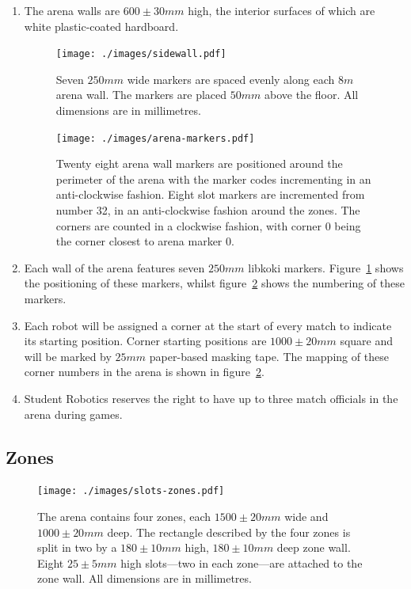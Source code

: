 \begin{enumerate}
\item The arena walls are $600\pm30mm$ high, the interior surfaces of which are white plastic-coated hardboard.

\begin{figure}
  \centering
  \texttt{[image: ./images/sidewall.pdf]}
  \caption{Seven $250mm$ wide markers are spaced evenly along each $8m$ arena wall.
           The markers are placed $50mm$ above the floor.
	   All dimensions are in millimetres.}
  \label{fig:arena-wall}
\end{figure}

\begin{figure}
  \centering
  \texttt{[image: ./images/arena-markers.pdf]}
  \caption{Twenty eight arena wall markers are positioned around the perimeter of the arena with the marker codes incrementing in an anti-clockwise fashion.
           Eight slot markers are incremented from number 32, in an anti-clockwise fashion around the zones.
           The corners are counted in a clockwise fashion, with corner 0 being the corner closest to arena marker 0.}
  \label{fig:arena-zones}
\end{figure}

\item Each wall of the arena features seven $250mm$ libkoki markers.
      Figure~\ref{fig:arena-wall} shows the positioning of these markers, whilst figure~\ref{fig:arena-zones} shows the numbering of these markers.

\item Each robot will be assigned a corner at the start of every match to indicate its starting position.
      Corner starting positions are $1000 \pm 20mm$ square and will be marked by $25mm$ paper-based masking tape.
      The mapping of these corner numbers in the arena is shown in figure~\ref{fig:arena-zones}.

\item Student Robotics reserves the right to have up to three match officials in the arena during games.

\end{enumerate}


\subsection{Zones}
\label{sub:Zones}

\begin{figure}
  \centering
  \texttt{[image: ./images/slots-zones.pdf]}
  \caption{The arena contains four zones, each $1500 \pm 20mm$ wide and $1000 \pm 20mm$ deep.
           The rectangle described by the four zones is split in two by a $180 \pm 10mm$ high, $180 \pm 10mm$ deep zone wall.
           Eight $25 \pm 5mm$ high slots---two in each zone---are attached to the zone wall.
           All dimensions are in millimetres.}
  \label{fig:slots-zones}
\end{figure}


